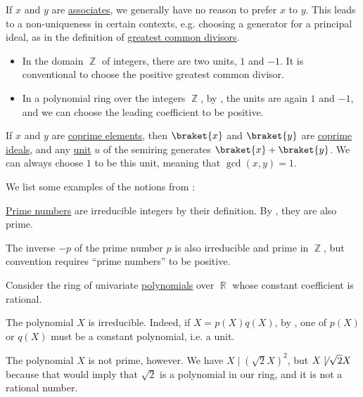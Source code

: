 \begin{remark}\label{rem:choice_of_associates}
  If \( x \) and \( y \) are \hyperref[def:domain_divisibility/associates]{associates}, we generally have no reason to prefer \( x \) to \( y \). This leads to a non-uniqueness in certain contexts, e.g. choosing a generator for a principal ideal, as in the definition of \hyperref[def:gcd_and_lcm]{greatest common divisors}.

  \begin{itemize}
    \item In the domain \( \BbbZ \) of integers, there are two units, \( 1 \) and \( -1 \). It is conventional to choose the positive greatest common divisor.

    \item In a polynomial ring over the integers \( \BbbZ \), by , the units are again \( 1 \) and \( -1 \), and we can choose the leading coefficient to be positive.
  \end{itemize}
\end{remark}

\begin{example}\label{ex:coprime_ideals_gcd}
  If \( x \) and \( y \) are \hyperref[def:domain_divisibility/coprime]{coprime elements}, then \( \braket{ x } \) and \( \braket{ y } \) are \hyperref[def:semiring_ideal/coprime]{coprime ideals}, and any \hyperref[def:divisibility/unit]{unit} \( u \) of the semiring generates \( \braket{ x } + \braket{ y } \). We can always choose \( 1 \) to be this unit, meaning that \( \gcd(x, y) = 1 \).
\end{example}

\begin{example}\label{ex:def:domain_divisibility}
  We list some examples of the notions from :
  \begin{thmenum}
     \hyperref[def:prime_number]{Prime numbers} are irreducible integers by their definition. By , they are also prime.

    The inverse \( -p \) of the prime number \( p \) is also irreducible and prime in \( \BbbZ \), but convention requires \enquote{prime numbers} to be positive.

     Consider the ring of univariate \hyperref[def:polynomial_semiring]{polynomials} over \( \BbbR \) whose constant coefficient is rational.

    The polynomial \( X \) is irreducible. Indeed, if \( X = p(X) q(X) \), by , one of \( p(X) \) or \( q(X) \) must be a constant polynomial, i.e. a unit.

    The polynomial \( X \) is not prime, however. We have \( X \mid (\sqrt 2 X)^2 \), but \( X \not\mid \sqrt 2 X \) because that would imply that \( \sqrt 2 \) is a polynomial in our ring, and it is not a rational number.
  \end{thmenum}
\end{example}

